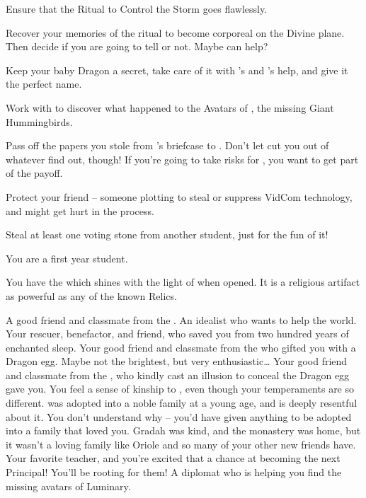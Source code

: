 \documentclass[char]{GL2020}
\begin{document}
\begin{itemz}
	\item Ensure that the Ritual to Control the Storm goes flawlessly.
	\item Recover your memories of the ritual to become corporeal on the Divine plane. Then decide if you are going to tell \cWildCard{} or not. Maybe \cTechStar{} can help?
	\item Keep your baby Dragon a secret, take care of it with \cPirateChild{}'s and \cAdopted{}'s help, and give it the perfect name.
	\item Work with \cJuniorStatesman{} to discover what happened to the Avatars of \cFarmGod{}, the missing Giant Hummingbirds.
	\item Pass off the papers you stole from \cBunker{}'s briefcase to \cWildCard{}. Don't let \cWildCard{\them} cut you out of whatever \cWildCard{\they} find\cWildCard{\plural} out, though! If you're going to take risks for \cWildCard{\them}, you want to get part of the payoff.
	\item Protect your friend \cTechStar{} – someone plotting to steal or suppress \cTechStar{\their} VidCom technology, and \cTechStar{} might get hurt in the process.
	\item Steal at least one voting stone from another student, just for the fun of it!
\end{itemz}

\begin{itemz}[Notes]
	\item You are a first year student.
	\item You have the \iLocket{} which shines with the light of \cFarmGod{} when opened. It is a religious artifact as powerful as any of the known Relics.
\end{itemz}

\begin{contacts}
		\contact{\cTechStar{}} A good friend and classmate from the \pTech{}. An idealist who wants to help the world.
	\contact{\cWildCard{}} Your rescuer, benefactor, and friend, who saved you from two hundred years of enchanted sleep.
	\contact{\cPirateChild{}} Your good friend and classmate from the \pShip{} who gifted you with a Dragon egg. Maybe not the brightest, but very enthusiastic…
	\contact{\cAdopted{}} Your good friend and classmate from the \pFarm{}, who kindly cast an illusion to conceal the Dragon egg \cPirateChild{} gave you. You feel a sense of kinship to \cAdopted{\them}, even though your temperaments are so different. \cAdopted{} was adopted into a noble family at a young age, and is deeply resentful about it. You don't understand why – you'd have given anything to be adopted into a family that loved you. Gradah was kind, and the monastery was home, but it wasn't a loving family like Oriole and so many of your other new friends have.
	\contact{\cMusic{}} Your favorite teacher, and you're excited that \cMusic{\they} \cMusic{\have} a chance at becoming the next Principal! You'll be rooting for them! 
	\contact{\cJuniorStatesman{}} A \pShip{} diplomat who is helping you find the missing avatars of Luminary.
\end{contacts}
\end{document}
